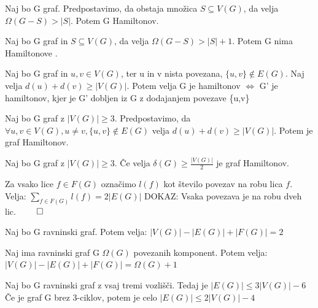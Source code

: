 \begin{slajd}
    {}{Naj bo G graf. Predpostavimo, da obstaja množica $S\subseteq V(G)$, da velja $\Omega(G-S) > |S|$. Potem G  Hamiltonov.}
\end{slajd}
 

\begin{slajd}
    {}{Naj bo G graf in $S\subseteq V(G)$, da velja $\Omega(G-S) > |S|+1$. Potem G nima Hamiltonove .}
\end{slajd}

\begin{slajd}
    {}{Naj bo G graf in $u,v \in  V(G)$, ter u in v nista povezana, $\{u,v\} \notin E(G)$. \break Naj velja $d(u) + d(v) \geq |V(G)|$. Potem velja \bigbreak G je hamiltonov $\Leftrightarrow$ G' je hamiltonov, kjer je G' dobljen iz G z dodajanjem povezave \{u,v\}}
\end{slajd}

\begin{slajd}
    {}{Naj bo G graf z $|V(G)|\geq 3$. Predpostavimo, da $\forall u,v \in  V(G), u\neq v, \{u,v\} \notin E(G)$ velja $d(u) + d(v) \geq |V(G)|$. \bigbreak Potem je graf Hamiltonov.}
\end{slajd}

\begin{slajd}
    {}{Naj bo G graf z $|V(G)|\geq 3$. \bigbreak Če velja $\delta(G)\geq \frac{|V(G)|}{2}$ je graf Hamiltonov.}
\end{slajd}

\begin{slajd}
    {}{Za vsako lice $f\in F(G)$ označimo $l(f)$ kot število povezav na robu lica $f$. Velja: \bigbreak
    $\sum_{f\in F(G)}^{}l(f) = 2|E(G)|$ \bigbreak DOKAZ: Vsaka povezava je na robu dveh lic. $\qed$}
\end{slajd}


\begin{slajd}
    {}{Naj bo G  ravninski graf. Potem velja: \bigbreak
    $|V(G)|-|E(G)|+|F(G)|=2$}
\end{slajd}

\begin{pagin}
    Naj ima ravninski graf G $\Omega(G)$ povezanih komponent. Potem velja: \break $|V(G)|-|E(G)|+|F(G)|=\Omega(G)+1$
\end{pagin}
\begin{pagin}
    Naj bo G
 ravninski graf z vsaj tremi vozlišči. Tedaj je
 $|E(G)|\leq 3|V(G)|-6$
\bigbreak
 Če je graf G
 brez 
3-ciklov, potem je celo
 $|E(G)|\leq 2|V(G)|-4$
\end{pagin}

